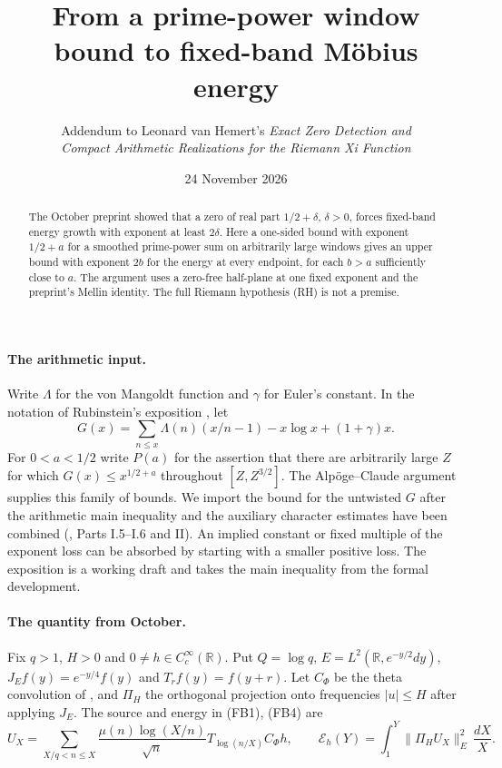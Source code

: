 \documentclass[11pt]{article}
\title{From a prime-power window bound to fixed-band M\"obius energy}
\author{Addendum to Leonard van Hemert's \emph{Exact Zero Detection and}\\
\emph{Compact Arithmetic Realizations for the Riemann Xi Function}}
\date{24 November 2026}
\newcommand{\E}{\mathcal E}
\begin{document}
\maketitle

\begin{abstract}
The October preprint showed that a zero of real part $1/2+\delta$, $\delta>0$, forces fixed-band energy growth with exponent at least $2\delta$. Here a one-sided bound with exponent $1/2+a$ for a smoothed prime-power sum on arbitrarily large windows gives an upper bound with exponent $2b$ for the energy at every endpoint, for each $b>a$ sufficiently close to $a$. The argument uses a zero-free half-plane at one fixed exponent and the preprint's Mellin identity. The full Riemann hypothesis (RH) is not a premise.
\end{abstract}

\paragraph{The arithmetic input.}
Write $\Lambda$ for the von Mangoldt function and $\gamma$ for Euler's constant. In the notation of Rubinstein's exposition \cite{guide}, let
\[
 G(x)=\sum_{n\le x}\Lambda(n)(x/n-1)-x\log x+(1+\gamma)x.
\]
For $0<a<1/2$ write $P(a)$ for the assertion that there are arbitrarily large $Z$ for which $G(x)\le x^{1/2+a}$ throughout $[Z,Z^{3/2}]$.
The Alp\"oge--Claude argument supplies this family of bounds. We import the bound for the untwisted $G$ after the arithmetic main inequality and the auxiliary character estimates have been combined (\cite{guide}, Parts I.5--I.6 and II). An implied constant or fixed multiple of the exponent loss can be absorbed by starting with a smaller positive loss. The exposition is a working draft and takes the main inequality from the formal development.

\paragraph{The quantity from October.}
Fix $q>1$, $H>0$ and $0\ne h\in C_c^\infty(\mathbb R)$. Put $Q=\log q$, $E=L^2(\mathbb R,e^{-y/2}dy)$, $J_E f(y)=e^{-y/4}f(y)$ and $T_rf(y)=f(y+r)$. Let $C_\Phi$ be the theta convolution of \cite{original}, and $\Pi_H$ the orthogonal projection onto frequencies $|u|\le H$ after applying $J_E$. The source and energy in (FB1), (FB4) are
\[
 U_X=\sum_{X/q<n\le X}\frac{\mu(n)\log(X/n)}{\sqrt n}
                 T_{\log(n/X)} C_\Phi h,\qquad
 \E_h(Y)=\int_1^Y\|\Pi_H U_X\|_E^2\,\frac{dX}{X}.
\]
\end{document}
